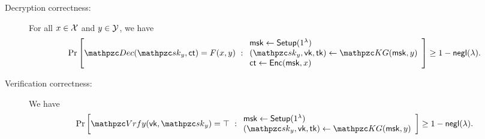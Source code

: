 \begin{definition}
\begin{description}
\item[Decryption correctness:] For all $x\in\mathcal{X}$ and
$y\in\mathcal{Y}$, we have
\begin{align}
\Pr\left[
\qDec(\qsk_y, \ct) \allowbreak = F(x,y)
\ :
\begin{array}{ll}
\msk\gets\Setup(1^\secp)\\
(\qsk_y,\vk,\tk)\gets\qKG(\msk,y)\\
\ct\gets\Enc(\msk,x)
\end{array}
\right] 
\ge 1-\negl(\secp).
\end{align}


\item[Verification correctness:] We have 
\begin{align}
\Pr\left[
\qVrfy(\vk,\qsk_y)=\top
\ :
\begin{array}{ll}
\msk\gets\Setup(1^\secp)\\
(\qsk_y,\vk,\tk)\gets\qKG(\msk,y)
\end{array}
\right] 
\ge1-\negl(\secp).
\end{align}

\end{description}
\end{definition}

